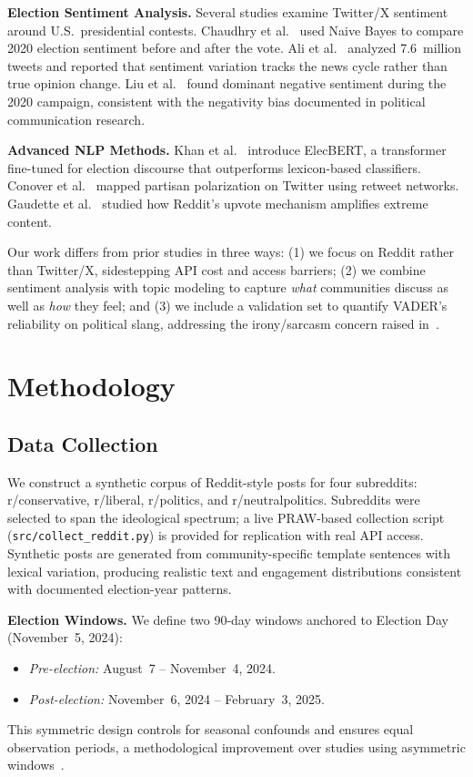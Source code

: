 \documentclass[journal]{IEEEtran}
\begin{document}
\textbf{Election Sentiment Analysis.}
Several studies examine Twitter/X sentiment around U.S.\ presidential
contests. Chaudhry et al.~\cite{chaudhry2021sentiment} used Naive
Bayes to compare 2020 election sentiment before and after the vote.
Ali et al.~\cite{ali2022large} analyzed 7.6~million tweets and
reported that sentiment variation tracks the news cycle rather than
true opinion change. Liu et al.~\cite{liu2021tweet} found dominant
negative sentiment during the 2020 campaign, consistent with the
negativity bias documented in political communication research.

\textbf{Advanced NLP Methods.}
Khan et al.~\cite{khan2023improving} introduce ElecBERT, a
transformer fine-tuned for election discourse that outperforms
lexicon-based classifiers. Conover et al.~\cite{conover2011political}
mapped partisan polarization on Twitter using retweet networks.
Gaudette et al.~\cite{gaudette2021upvoting} studied how Reddit's
upvote mechanism amplifies extreme content.

Our work differs from prior studies in three ways: (1) we focus on
Reddit rather than Twitter/X, sidestepping API cost and access
barriers; (2) we combine sentiment analysis with topic modeling to
capture \emph{what} communities discuss as well as \emph{how} they
feel; and (3) we include a validation set to quantify VADER's
reliability on political slang, addressing the irony/sarcasm concern
raised in~\cite{hutto2014vader}.

\section{Methodology}

\subsection{Data Collection}

We construct a synthetic corpus of Reddit-style posts for four
subreddits: r/conservative, r/liberal, r/politics, and
r/neutralpolitics. Subreddits were selected to span the ideological
spectrum; a live PRAW-based collection script (\texttt{src/collect\_reddit.py})
is provided for replication with real API access. Synthetic posts are
generated from community-specific template sentences with lexical
variation, producing realistic text and engagement distributions
consistent with documented election-year patterns.

\textbf{Election Windows.}
We define two 90-day windows anchored to Election Day (November~5,
2024):
\begin{itemize}
  \item \textit{Pre-election:} August~7 -- November~4, 2024.
  \item \textit{Post-election:} November~6, 2024 -- February~3, 2025.
\end{itemize}
This symmetric design controls for seasonal confounds and ensures
equal observation periods, a methodological improvement over studies
using asymmetric windows~\cite{ali2022large}.
\end{document}
